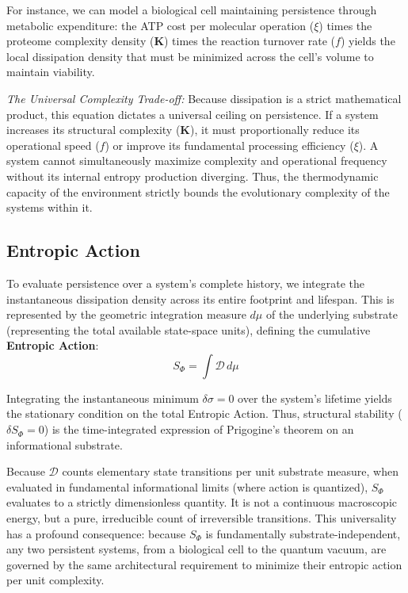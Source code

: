 For instance, we can model a biological cell maintaining persistence through metabolic expenditure: the ATP cost per molecular operation ($\xi$) times the proteome complexity density ($\mathbf{K}$) times the reaction turnover rate ($f$) yields the local dissipation density that must be minimized across the cell's volume to maintain viability.

\textit{The Universal Complexity Trade-off:} Because dissipation is a strict mathematical product, this equation dictates a universal ceiling on persistence. If a system increases its structural complexity ($\mathbf{K}$), it must proportionally reduce its operational speed ($f$) or improve its fundamental processing efficiency ($\xi$). A system cannot simultaneously maximize complexity and operational frequency without its internal entropy production diverging. Thus, the thermodynamic capacity of the environment strictly bounds the evolutionary complexity of the systems within it.

\subsection{Entropic Action}
To evaluate persistence over a system's complete history, we integrate the instantaneous dissipation density across its entire footprint and lifespan. This is represented by the geometric integration measure $d\mu$ of the underlying substrate (representing the total available state-space units), defining the cumulative \textbf{Entropic Action}:
\begin{equation}
    S_\Phi = \int \mathcal{D} \, d\mu
\end{equation}

Integrating the instantaneous minimum $\delta\sigma = 0$ over the system's lifetime yields the stationary condition on the total Entropic Action. Thus, structural stability ($\delta S_\Phi = 0$) is the time-integrated expression of Prigogine's theorem on an informational substrate. 

Because $\mathcal{D}$ counts elementary state transitions per unit substrate measure, when evaluated in fundamental informational limits (where action is quantized), $S_\Phi$ evaluates to a strictly dimensionless quantity. It is not a continuous macroscopic energy, but a pure, irreducible count of irreversible transitions. This universality has a profound consequence: because $S_\Phi$ is fundamentally substrate-independent, any two persistent systems, from a biological cell to the quantum vacuum, are governed by the same architectural requirement to minimize their entropic action per unit complexity.

